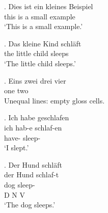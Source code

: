 

\ex. \gll Dies ist ein kleines Beispiel \\
     this is a small example \\
\glt `This is a small example.'

\ex. \gll Das {kleine Kind} schl\"aft \\
     the {little child} sleeps \\
\glt `The little child sleeps.'

\ex. \gll Eins zwei drei vier \\
     one two \\
\glt Unequal lines: empty gloss cells.

\ex. \glll Ich habe geschlafen \\
      ich hab-e schlaf-en \\
       have- sleep- \\
\glt `I slept.'

\ex. \gl Der Hund schl\"aft \\
     der Hund schlaf-t \\
      dog sleep- \\
     D N V \\ \endgl
\glt `The dog sleeps.'

